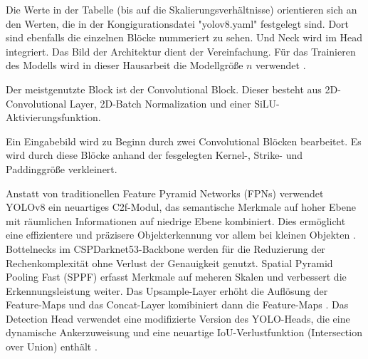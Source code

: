 \documentclass[a4paper,12pt]{article}
\begin{document}
\noindent Die Werte in der Tabelle (bis auf die Skalierungsverhältnisse) orientieren sich an den Werten, die in der Kongigurationsdatei "yolov8.yaml" festgelegt sind. Dort sind ebenfalls die einzelnen Blöcke nummeriert zu sehen. Und Neck wird im Head integriert. Das Bild der Architektur dient der Vereinfachung. Für das Trainieren des Modells wird in dieser Hausarbeit die Modellgröße $n$ verwendet \cite{ultralytics_yolov8}. %

\noindent Der meistgenutzte Block ist der Convolutional Block. Dieser besteht aus 2D-Convolutional Layer, 2D-Batch Normalization und einer SiLU-Aktivierungsfunktion. 

\noindent Ein Eingabebild wird zu Beginn durch zwei Convolutional Blöcken bearbeitet. Es wird durch diese Blöcke anhand der fesgelegten Kernel-, Strike- und Paddinggröße verkleinert. %

\noindent Anstatt von traditionellen Feature Pyramid Networks (FPNs) verwendet YOLOv8 ein neuartiges C2f-Modul, das semantische Merkmale auf hoher Ebene mit räumlichen Informationen auf niedrige Ebene kombiniert. Dies ermöglicht eine effizientere und präzisere Objekterkennung vor allem bei kleinen Objekten \cite{yolov8_architecture}.
\noindent Bottelnecks im CSPDarknet53-Backbone werden für die Reduzierung der Rechenkomplexität ohne Verlust der Genauigkeit genutzt.
\noindent Spatial Pyramid Pooling Fast (SPPF) erfasst Merkmale auf meheren Skalen und verbessert die Erkennungsleistung weiter.
\noindent Das Upsample-Layer erhöht die Auflösung der Feature-Maps und das Concat-Layer komibiniert dann die Feature-Maps \cite{terven2023comprehensive}.
\noindent Das Detection Head verwendet eine modifizierte Version des YOLO-Heads, die eine dynamische Ankerzuweisung und eine neuartige IoU-Verlustfunktion (Intersection over Union) enthält \cite{yolov8_architecture}. %


\FloatBarrier

\printbibliography
\end{document}

